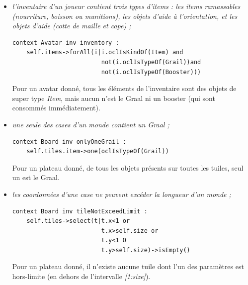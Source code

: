 \documentclass[oneside,a4paper]{book}
\begin{document}
\begin{itemize}
    \item \textit{l'inventaire d'un joueur contient trois types d'items : les items ramassables (nourriture, boisson ou munitions), les objets d'aide à l'orientation, et les objets d'aide (cotte de maille et cape) ;}
        \begin{lstlisting}
context Avatar inv inventory : 
    self.items->forAll(i|i.oclIsKindOf(Item) and 
                         not(i.oclIsTypeOf(Grail))and
                         not(i.oclIsTypeOf(Booster)))
        \end{lstlisting}
    Pour un avatar donné, tous les éléments de l'inventaire sont des objets de super type \textit{Item}, mais aucun n'est le Graal ni un booster (qui sont consommés immédiatement).
    
    \item \textit{une seule des cases d'un monde contient un Graal ;}
        \begin{lstlisting}
context Board inv onlyOneGrail : 
    self.tiles.item->one(oclIsTypeOf(Grail))
        \end{lstlisting}
        Pour un plateau donné, de tous les objets présents sur toutes les tuiles, seul un est le Graal.

    \item \textit{les coordonnées d'une case ne peuvent excéder la longueur d'un monde ;}
        \begin{lstlisting}
context Board inv tileNotExceedLimit : 
    self.tiles->select(t|t.x<1 or 
                         t.x>self.size or 
                         t.y<1 O 
                         t.y>self.size)->isEmpty()
        \end{lstlisting}
    Pour un plateau donné, il n'existe aucune tuile dont l'un des paramètres est hors-limite (en dehors de l'intervalle \textit{{[}1:size{]}}).
    

\end{itemize}
\end{document}
